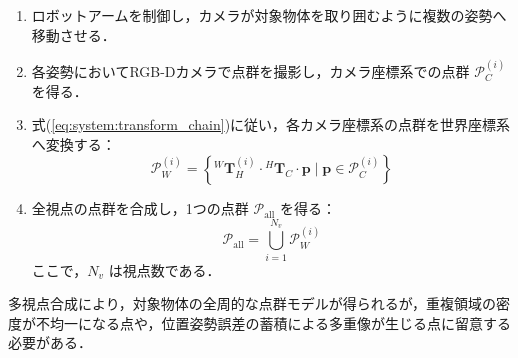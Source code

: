 \begin{enumerate}
  \item ロボットアームを制御し，カメラが対象物体を取り囲むように複数の姿勢へ移動させる．
  \item 各姿勢においてRGB-Dカメラで点群を撮影し，カメラ座標系での点群 $\mathcal{P}_{C}^{(i)}$ を得る．
  \item 式(\ref{eq:system:transform_chain})に従い，各カメラ座標系の点群を世界座標系へ変換する：
  \begin{equation}
    \mathcal{P}_{W}^{(i)} = \left\{ {}^{W}\bm{T}_{H}^{(i)} \cdot {}^{H}\bm{T}_{C} \cdot \bm{p} \;|\; \bm{p} \in \mathcal{P}_{C}^{(i)} \right\}
  \end{equation}
  \item 全視点の点群を合成し，1つの点群 $\mathcal{P}_{\mathrm{all}}$ を得る：
  \begin{equation}
    \mathcal{P}_{\mathrm{all}} = \bigcup_{i=1}^{N_v} \mathcal{P}_{W}^{(i)}
  \end{equation}
  ここで，$N_v$ は視点数である．
\end{enumerate}

多視点合成により，対象物体の全周的な点群モデルが得られるが，重複領域の密度が不均一になる点や，位置姿勢誤差の蓄積による多重像が生じる点に留意する必要がある．





